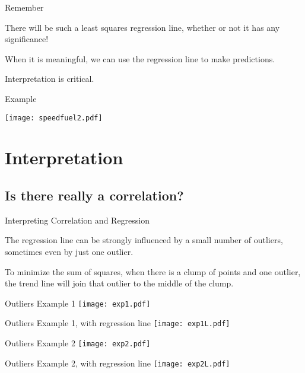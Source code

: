 \documentclass{beamer}
\begin{document}
\begin{frame}{Remember}

There will be such a least squares regression line, whether or not it has any significance!

\vfill
When it is meaningful, we can use the regression line to
make predictions.

\vfill
Interpretation is critical.
\end{frame}

\begin{frame}{Example}

\texttt{[image: speedfuel2.pdf]}

\end{frame}

\section{Interpretation} 
\subsection{Is there really a correlation?}
\begin{frame}{Interpreting Correlation and Regression}


The regression line can be strongly influenced by
a small number of outliers, sometimes even by just
one outlier.

\vfill
To minimize the sum of squares, when there is 
a clump of points and one outlier, the trend line
will join that outlier to the middle of the clump.  
\end{frame}


\begin{frame}{Outliers Example 1}
\texttt{[image: exp1.pdf]}
\end{frame}

\begin{frame}{Outliers Example 1, with regression line}
\texttt{[image: exp1L.pdf]}
\end{frame}

\begin{frame}{Outliers Example 2}
\texttt{[image: exp2.pdf]}
\end{frame}

\begin{frame}{Outliers Example 2, with regression line}
\texttt{[image: exp2L.pdf]}
\end{frame}
\end{document}
